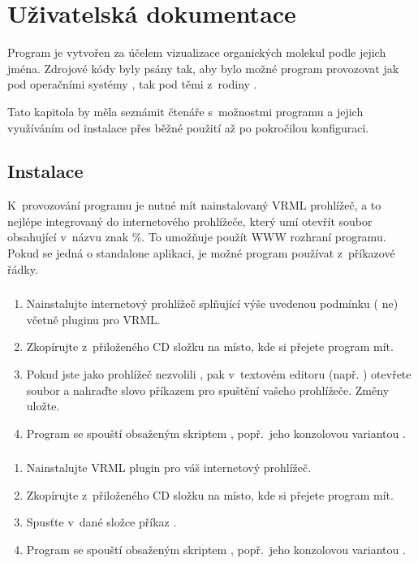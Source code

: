 \chapter{Uživatelská dokumentace}
Program  je vytvořen za účelem vizualizace organických molekul
podle jejich jména. Zdrojové kódy byly psány tak, aby bylo možné program
provozovat jak pod operačními systémy , tak pod těmi
z~rodiny .

Tato kapitola by měla seznámit čtenáře s~možnostmi programu a jejich využíváním
od instalace přes běžné použití až po pokročilou konfiguraci.

\section{Instalace}
K~provozování programu je nutné mít nainstalovaný VRML prohlížeč, a to nejlépe
integrovaný do internetového prohlížeče, který umí otevřít soubor obsahující
v~názvu znak \%. To umožňuje použít WWW rozhraní programu. Pokud se jedná o
standalone aplikaci, je možné program používat z~příkazové řádky.

\subsection{}
\begin{enumerate}
	\item Nainstalujte internetový prohlížeč splňující výše uvedenou podmínku
		  ( ne) včetně pluginu pro VRML.
	\item Zkopírujte z~přiloženého CD složku 
		  na místo, kde si přejete program mít.
	\item Pokud jste jako prohlížeč nezvolili , pak v~textovém
		  editoru (např. ) otevřete soubor
		   a nahraďte slovo  příkazem pro
		  spuštění vašeho prohlížeče. Změny uložte.
	\item Program se spouští obsaženým skriptem ,
		  popř.~jeho konzolovou variantou .
\end{enumerate}

\subsection{}
\begin{enumerate}
	\item Nainstalujte VRML plugin pro váš internetový prohlížeč.
	\item Zkopírujte z~přiloženého CD složku  na místo,
		  kde si přejete program mít.
	\item Spusťte v~dané složce příkaz .
	\item Program se spouští obsaženým skriptem ,
		  popř.~jeho konzolovou variantou .
\end{enumerate}

